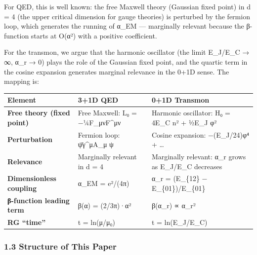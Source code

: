 \documentclass[
]{article}
\newcounter{none} %
\begin{document}
For QED, this is well known: the free Maxwell theory (Gaussian fixed
point) in d = 4 (the upper critical dimension for gauge theories) is
perturbed by the fermion loop, which generates the running of α\_EM ---
marginally relevant because the β-function starts at O(α²) with a
positive coefficient.

For the transmon, we argue that the harmonic oscillator (the limit
E\_J/E\_C → ∞, α\_r → 0) plays the role of the Gaussian fixed point, and
the quartic term in the cosine expansion generates marginal relevance in
the 0+1D sense. The mapping is:

{\def\LTcaptype{none} %
\begin{longtable}[]{@{}
  >{\raggedright\arraybackslash}p{}
  >{\raggedright\arraybackslash}p{}
  >{\raggedright\arraybackslash}p{}@{}}
\toprule\noalign{}
\begin{minipage}[b]{\linewidth}\raggedright
Element
\end{minipage} & \begin{minipage}[b]{\linewidth}\raggedright
3+1D QED
\end{minipage} & \begin{minipage}[b]{\linewidth}\raggedright
0+1D Transmon
\end{minipage} \\
\midrule\noalign{}
\endhead
\bottomrule\noalign{}
\endlastfoot
\textbf{Free theory (fixed point)} & Free Maxwell: L₀ = −¼F\_μνF\^{}μν &
Harmonic oscillator: H₀ = 4E\_C n² + ½E\_J φ² \\
\textbf{Perturbation} & Fermion loop: ψ̄γ\^{}μA\_μ ψ & Cosine expansion:
−(E\_J/24)φ⁴ + \ldots{} \\
\textbf{Relevance} & Marginally relevant in d = 4 & Marginally relevant:
α\_r grows as E\_J/E\_C decreases \\
\textbf{Dimensionless coupling} & α\_EM = e²/(4π) & α\_r = (E\_\{12\} −
E\_\{01\})/E\_\{01\} \\
\textbf{β-function leading term} & β(α) = (2/3π)·α² & β(α\_r) ∝ α\_r² \\
\textbf{RG ``time''} & t = ln(μ/μ₀) & t = ln(E\_J/E\_C) \\
\end{longtable}
}

\subsubsection{1.3 Structure of This
Paper}\label{structure-of-this-paper}
\end{document}
